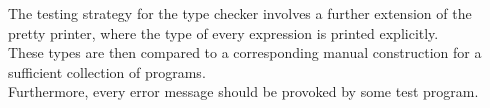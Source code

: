 \begin{slide*}
The testing strategy for the type checker involves a further extension of the pretty printer,
where the type of every expression is printed explicitly.\\

These types are then compared to a corresponding manual construction for a sufficient
collection of programs.\\
 
Furthermore, every error message should be provoked by some test program.
\vfil
\end{slide*}
 
\begin{slide*}
\vfil
\end{slide*}
 


